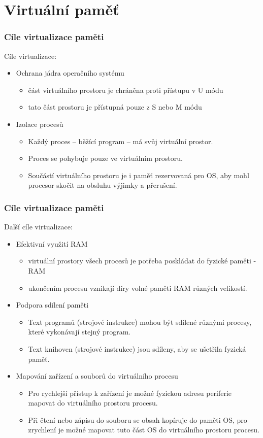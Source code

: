 \documentclass[aspectratio=169]{beamer}
\begin{document}
\section{Virtuální paměť}


\begin{frame}
\frametitle{Cíle virtualizace paměti}

Cíle virtualizace:
\begin{itemize}
 \item Ochrana jádra operačního systému
 \begin{itemize}
 \item část virtuálního prostoru je chráněna proti přístupu v U módu
 \item tato část prostoru je přístupná pouze z S nebo M módu
\end{itemize}
\item Izolace procesů
 \begin{itemize}
 \item Každý proces -- běžící program -- má svůj virtuální prostor.
 \item Proces se pohybuje pouze ve virtuálním prostoru.
 \item Součástí virtuálního prostoru je i paměť rezervovaná pro OS, aby mohl procesor skočit na obsluhu výjimky a přerušení.
\end{itemize}
\end{itemize}
\end{frame}


\begin{frame}
\frametitle{Cíle virtualizace paměti}

Další cíle virtualizace:
\begin{itemize}
 \item Efektivní využití RAM
 \begin{itemize}
 \item virtuální prostory všech procesů je potřeba poskládat do fyzické paměti - RAM
 \item ukončením procesu vznikají díry volné paměti RAM různých velikostí.
\end{itemize}
\item Podpora sdílení paměti
 \begin{itemize}
 \item Text programů (strojové instrukce) mohou být sdílené různými procesy, které vykonávají stejný program.
 \item Text knihoven (strojové instrukce) jsou sdíleny, aby se ušetřila fyzická paměť.
 \end{itemize}
\item Mapování zařízení a souborů do virtuálního procesu
 \begin{itemize}
 \item Pro rychlejší přístup k zařízení je možné fyzickou adresu periferie mapovat do virtuálního prostoru procesu.
 \item Při čtení nebo zápisu do souboru se obsah kopíruje do paměti OS, pro zrychlení je možné mapovat tuto část OS do virtuálního prostoru procesu.
 \end{itemize}
\end{itemize}
\end{frame}
\end{document}

